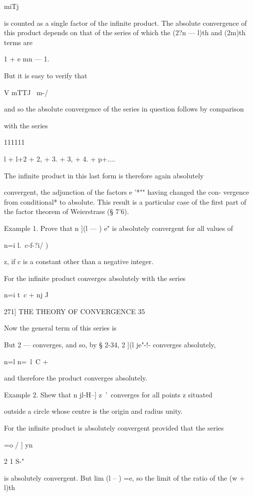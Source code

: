 miTj 



is counted as a single factor of the infinite product. The absolute convergence 
of this product depends on that of the series of which the (2?n — l)th and 
(2m)th terms are 

1 + e mn — 1. 

But it is easy to verify that 

V mTTJ \ m-/ 

and so the absolute convergence of the series in question follows by comparison 

with the series 

111111 

l + l+2  + 2, + 3. + 3, + 4. + p+.... 

The infinite product in this last form is therefore again absolutely 

convergent, the adjunction of the factors e '*"" having changed the con- 
vergence from conditional* to absolute. This result is a particular case of 
the first part of the factor theorem of Weierstrass (§ 7'6). 

Example 1. Prove that n ](l — ) e"   is absolutely convergent for all values of 

n=i l.\ c-f-?i/ ) 

z, if c is a constant other than a negative integer. 

For the infinite product converges absolutely with the series 

n=i t\ c + nj J 



271] THE THEORY OF CONVERGENCE 35 

Now the general term of this series is 

But 2 — converges, and so, by § 2-34, 2 ](l je"-!- converges absolutely, 

n=l   n=\ l\ C + %

and therefore the product converges absolutely. 

Example 2. Shew that n jl-H--] z~'\ converges for all points z situated 

outside a circle whose centre is the origin and radius unity. 

For the infinite product is absolutely convergent provided that the series 

=o / ] yn 

2 1 S-" 

is absolutely convergent. But lim (l -- ) =e, so the limit of the ratio of the (w + l)th 

